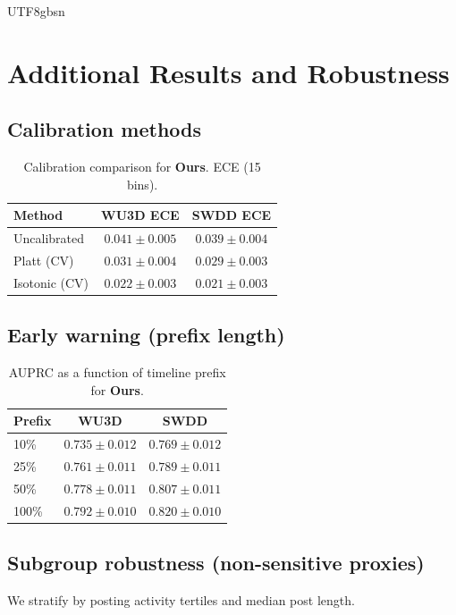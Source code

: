 \documentclass[acmsmall,natbib]{acmart}
\begin{document}
\begin{CJK*}{UTF8}{gbsn}

\section{Additional Results and Robustness}
\label{app:robustness}

\subsection{Calibration methods}
\begin{table}[h]
\centering
\caption{Calibration comparison for \textbf{Ours}. ECE (15 bins).}
\label{tab:calib}
\setlength{\tabcolsep}{9pt}
\begin{tabular}{lcc}
\toprule
\textbf{Method} & \textbf{WU3D ECE} & \textbf{SWDD ECE} \\
\midrule
Uncalibrated & $0.041{\pm}0.005$ & $0.039{\pm}0.004$ \\
Platt (CV) & $0.031{\pm}0.004$ & $0.029{\pm}0.003$ \\
Isotonic (CV) & $\mathbf{0.022}{\pm}0.003$ & $\mathbf{0.021}{\pm}0.003$ \\
\bottomrule
\end{tabular}
\end{table}

\subsection{Early warning (prefix length)}
\begin{table}[h]
\centering
\caption{AUPRC as a function of timeline prefix for \textbf{Ours}.}
\label{tab:prefix}
\setlength{\tabcolsep}{7pt}
\begin{tabular}{lcc}
\toprule
\textbf{Prefix} & \textbf{WU3D} & \textbf{SWDD} \\
\midrule
10\% & $0.735{\pm}0.012$ & $0.769{\pm}0.012$ \\
25\% & $0.761{\pm}0.011$ & $0.789{\pm}0.011$ \\
50\% & $0.778{\pm}0.011$ & $0.807{\pm}0.011$ \\
100\% & $0.792{\pm}0.010$ & $0.820{\pm}0.010$ \\
\bottomrule
\end{tabular}
\end{table}

\subsection{Subgroup robustness (non-sensitive proxies)}
We stratify by posting activity tertiles and median post length.


\end{CJK*}
\end{document}
